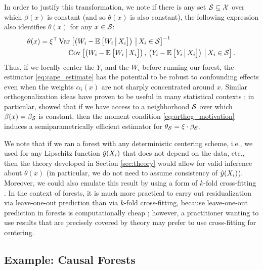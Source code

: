 \documentclass[aos]{imsart}
\theoremstyle{plain}
\theoremstyle{definition}
\theoremstyle{remark}
\begin{document}
\begin{CJK}{UTF8}{gbsn}
{In order to justify this transformation, we note if there is any set $\mathcal{S} \subseteq \mathcal{X}$
over which $\beta(x)$ is constant (and so $\theta(x)$ is also constant), the following expression
also identifies $\theta(x)$ for any $x \in \mathcal{S}$:
\begin{equation}
\label{eq:orthog_motivation}
\begin{split}
\theta(x) = \xi^\top &\Var{\p{W_i - \EE{W_i \cond X_i}} \cond X_i \in \set}^{-1} \\
& \ \ \ \ \Cov{\p{W_i - \EE{W_i \cond X_i}}, \, \p{Y_i - \EE{Y_i \cond X_i}} \cond X_i \in \set}.
\end{split}
\end{equation}
Thus, if we locally center the $Y_i$ and the $W_i$ before running our forest, the estimator
\eqref{eq:cape_estimate} has the potential to be robust to confounding effects
even when the weights $\alpha_i(x)$ are not sharply concentrated around $x$.
Similar orthogonalization ideas have proven to be useful in many statistical contexts
\citep[e.g.,][]{chernozhukov2016double,newey1994asymptotic,neyman1979c};
in particular, \citet{robinson1988root} showed that if we have access to a neighborhood $\mathcal{S}$
over which $\beta(x) = \beta_{\mathcal{S}}$ is constant, then the moment condition \eqref{eq:orthog_motivation}
induces a semiparametrically efficient estimator for $\theta_{\mathcal{S}} = \xi \cdot \beta_{\mathcal{S}}$.

We note that if we ran a forest with any deterministic
centering scheme, i.e., we used  for any Lipschitz function $\hat{y}(X_i)$
that does not depend on the data, etc., then the theory developed in Section \ref{sec:theory}
would allow for valid inference about $\theta(x)$ (in particular, we do not need to
assume consistency of $\hat{y}(X_i)$). Moreover, we could also emulate this result by using a form of $k$-fold
cross-fitting \citep{chernozhukov2016double,schick1986asymptotically}.
In the context of forests, it is much more practical to carry out residualization
via leave-one-out prediction than via $k$-fold cross-fitting, because
leave-one-out prediction in forests is computationally cheap \citep{breiman2001random};
however, a practitioner wanting to use results that are precisely covered by theory may prefer
to use cross-fitting for centering.

\subsection{Example: Causal Forests}
\label{sec:cf}

}
\end{CJK}
\end{document}
